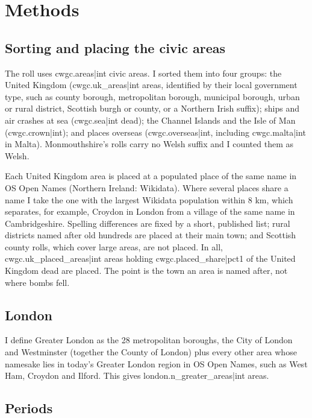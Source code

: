 \documentclass[11pt,a4paper]{article}
\begin{document}
\section{Methods}

\subsection{Sorting and placing the civic areas}

The roll uses {{cwgc.areas|int}} civic areas. I sorted them into four groups: the United Kingdom ({{cwgc.uk_areas|int}} areas, identified by their local government type, such as county borough, metropolitan borough, municipal borough, urban or rural district, Scottish burgh or county, or a Northern Irish suffix); ships and air crashes at sea ({{cwgc.sea|int}} dead); the Channel Islands and the Isle of Man ({{cwgc.crown|int}}); and places overseas ({{cwgc.overseas|int}}, including {{cwgc.malta|int}} in Malta). Monmouthshire's rolls carry no Welsh suffix and I counted them as Welsh.

Each United Kingdom area is placed at a populated place of the same name in OS Open Names (Northern Ireland: Wikidata). Where several places share a name I take the one with the largest Wikidata population within 8 km, which separates, for example, Croydon in London from a village of the same name in Cambridgeshire. Spelling differences are fixed by a short, published list; rural districts named after old hundreds are placed at their main town; and Scottish county rolls, which cover large areas, are not placed. In all, {{cwgc.uk_placed_areas|int}} areas holding {{cwgc.placed_share|pct1}} of the United Kingdom dead are placed. The point is the town an area is named after, not where bombs fell.

\subsection{London}

I define Greater London as the 28 metropolitan boroughs, the City of London and Westminster (together the County of London) plus every other area whose namesake lies in today's Greater London region in OS Open Names, such as West Ham, Croydon and Ilford. This gives {{london.n_greater_areas|int}} areas.

\subsection{Periods}
\end{document}

